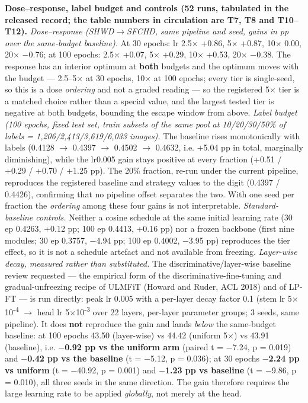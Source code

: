 \documentclass[pdflatex,sn-mathphys-ay]{sn-jnl}
\begin{document}
\textbf{Dose--response, label budget and controls (52 runs, tabulated in the released record; the table numbers in circulation are T7, T8 and T10--T12).} \emph{Dose--response (SHWD\ensuremath{\rightarrow}SFCHD, same pipeline and seed, gains in pp over the same-budget baseline).} At 30 epochs: lr 2.5\ensuremath{\times} +0.86, 5\ensuremath{\times} +0.87, 10\ensuremath{\times} 0.00, 20\ensuremath{\times} \ensuremath{-}0.76; at 100 epochs: 2.5\ensuremath{\times} +0.07, 5\ensuremath{\times} +0.29, 10\ensuremath{\times} +0.53, 20\ensuremath{\times} \ensuremath{-}0.38. The response has an interior optimum at \textbf{both} budgets and the optimum moves with the budget --- 2.5--5\ensuremath{\times} at 30 epochs, 10\ensuremath{\times} at 100 epochs; every tier is single-seed, so this is a dose \emph{ordering} and not a graded reading --- so the registered 5\ensuremath{\times} tier is a matched choice rather than a special value, and the largest tested tier is negative at both budgets, bounding the escape window from above. \emph{Label budget (100 epochs, fixed test set, train subsets of the same pool at 10/20/30/50\% of labels = 1,206/2,413/3,619/6,033 images).} The baseline rises monotonically with labels (0.4128 \ensuremath{\rightarrow} 0.4397 \ensuremath{\rightarrow} 0.4502 \ensuremath{\rightarrow} 0.4632, i.e. +5.04 pp in total, marginally diminishing), while the lr0.005 gain stays positive at every fraction (+0.51 / +0.29 / +0.70 / +1.25 pp). The 20\% fraction, re-run under the current pipeline, reproduces the registered baseline and strategy values to the digit (0.4397 / 0.4426), confirming that no pipeline offset separates the two. With one seed per fraction the \emph{ordering} among these four gains is not interpretable. \emph{Standard-baseline controls.} Neither a cosine schedule at the same initial learning rate (30 ep 0.4263, +0.12 pp; 100 ep 0.4413, +0.16 pp) nor a frozen backbone (first nine modules; 30 ep 0.3757, \ensuremath{-}4.94 pp; 100 ep 0.4002, \ensuremath{-}3.95 pp) reproduces the tier effect, so it is not a schedule artefact and not available from freezing. \emph{Layer-wise decay, measured rather than substituted.} The discriminative/layer-wise baseline review requested --- the empirical form of the discriminative-fine-tuning and gradual-unfreezing recipe of ULMFiT (Howard and Ruder, ACL 2018) and of LP-FT \citep{zhang2026} --- is run directly: peak lr 0.005 with a per-layer decay factor 0.1 (stem lr 5\ensuremath{\times}10\textsuperscript{-4} \ensuremath{\rightarrow} head lr 5\ensuremath{\times}10\textsuperscript{-3} over 22 layers, per-layer parameter groups; 3 seeds, same pipeline). It does \textbf{not} reproduce the gain and lands \emph{below} the same-budget baseline: at 100 epochs 43.50 (layer-wise) vs 44.42 (uniform 5\ensuremath{\times}) vs 43.91 (baseline), i.e. \textbf{\ensuremath{-}0.92 pp vs the uniform arm} (paired t = \ensuremath{-}7.24, p = 0.019) and \textbf{\ensuremath{-}0.42 pp vs the baseline} (t = \ensuremath{-}5.12, p = 0.036); at 30 epochs \textbf{\ensuremath{-}2.24 pp vs uniform} (t = \ensuremath{-}40.92, p = 0.001) and \textbf{\ensuremath{-}1.23 pp vs baseline} (t = \ensuremath{-}9.86, p = 0.010), all three seeds in the same direction. The gain therefore requires the large learning rate to be applied \emph{globally}, not merely at the head. 
\end{document}
